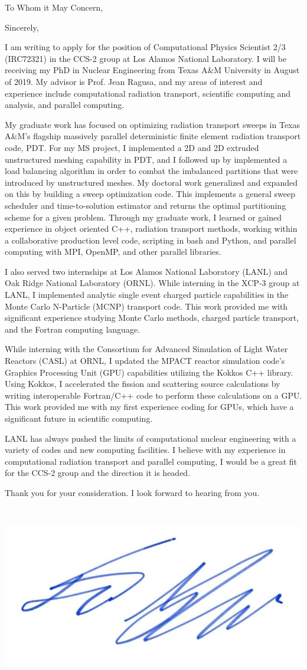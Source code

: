 \documentclass[11pt,letterpaper,roman]{moderncv}        %
\makeatletter
\renewcommand*{\makeletterclosing}{
	\@closing\\[0em]%
	{\includegraphics[scale=0.1]{../signature_ghaddar.jpg}
		\par
		\bfseries \@firstname~\@lastname}%
		\\
	\ifthenelse{\isundefined{\@enclosure}}{}{%
		\vfill%
		{\color{color2}\itshape\enclname: \@enclosure}}}
\makeatother
\begin{document}
\date{\today}
\opening{To Whom it May Concern,}
\closing{Sincerely,}

\makelettertitle

I am writing to apply for the position of Computational Physics Scientist 2/3 (IRC72321) in the CCS-2 group at Los Alamos National Laboratory. I will be receiving my PhD in Nuclear Engineering from Texas A\&M University in August of 2019. My advisor is Prof. Jean Ragusa, and my areas of interest and experience include computational radiation transport, scientific computing and analysis, and parallel computing. 

My graduate work has focused on optimizing radiation transport sweeps in Texas A\&M's flagship massively parallel deterministic finite element radiation transport code, PDT. For my MS project, I implemented a 2D and 2D extruded unstructured meshing capability in PDT, and I followed up by implemented a load balancing algorithm in order to combat the imbalanced partitions that were introduced by unstructured meshes. My doctoral work generalized and expanded on this by building a sweep optimization code. This implements a general sweep scheduler and time-to-solution estimator and returns the optimal partitioning scheme for a given problem. Through my graduate work, I learned or gained experience in object oriented C++, radiation transport methods, working within a collaborative production level code, scripting in bash and Python, and parallel computing with MPI, OpenMP, and other parallel libraries.

I also served two internships at Los Alamos National Laboratory (LANL) and Oak Ridge National Laboratory (ORNL). While interning in the XCP-3 group at LANL, I implemented analytic single event charged particle capabilities in the Monte Carlo N-Particle (MCNP) transport code. This work provided me with significant experience studying Monte Carlo methods, charged particle transport, and the Fortran computing language. 

While interning with the Consortium for Advanced Simulation of Light Water Reactors (CASL) at ORNL, I updated the MPACT reactor simulation code's Graphics Processing Unit (GPU) capabilities utilizing the Kokkos C++ library. Using Kokkos, I accelerated the fission and scattering source calculations by writing interoperable Fortran/C++ code to perform these calculations on a GPU. This work provided me with my first experience coding for GPUs, which have a significant future in scientific computing.

LANL has always pushed the limits of computational nuclear engineering with a variety of codes and new computing facilities. I believe with my experience in computational radiation transport and parallel computing, I would be a great fit for the CCS-2 group and the direction it is headed. 

Thank you for your consideration. I look forward to hearing from you.

\makeletterclosing
\end{document}
